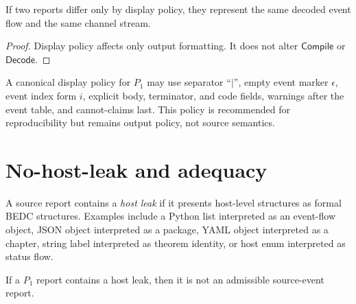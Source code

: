 \begin{proposition}
\label{prop:source-report-display-policy-roundtrip}
If two reports differ only by display policy, they represent the same decoded event flow and the same channel stream.
\end{proposition}

\begin{proof}
Display policy affects only output formatting. It does not alter $\mathsf{Compile}$ or $\mathsf{Decode}$.
\end{proof}

\begin{definition}
\label{def:source-report-canonical-display-policy}
A canonical display policy for $P_1$ may use separator ``$\mid$'', empty event marker $\epsilon$, event index form $i$, explicit body, terminator, and code fields, warnings after the event table, and cannot-claims last. This policy is recommended for reproducibility but remains output policy, not source semantics.
\end{definition}

\section{No-host-leak and adequacy}
\label{sec:source-report-no-host-leak-adequacy}

\begin{definition}
\label{def:source-report-host-leak}
A source report contains a \emph{host leak} if it presents host-level structures as formal BEDC structures. Examples include a Python list interpreted as an event-flow object, JSON object interpreted as a package, YAML object interpreted as a chapter, string label interpreted as theorem identity, or host enum interpreted as status flow.
\end{definition}

\begin{theorem}
\label{thm:source-report-host-leak-inadmissible}
If a $P_1$ report contains a host leak, then it is not an admissible source-event report.
\end{theorem}

